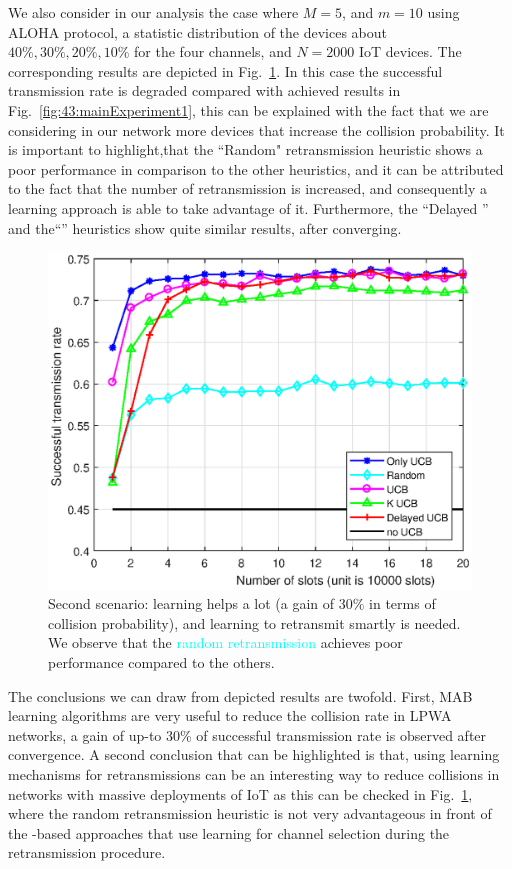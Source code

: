 We also consider in our analysis the case where $M=5$, and $m=10$ using ALOHA protocol, a statistic distribution of the devices about $40\%, 30\%, 20\%, 10\%$ for the four channels, and $N=2000$ IoT devices.
The corresponding results are depicted in Fig.~\ref{fig:43:mainExperiment2}.
In this case the successful transmission rate is degraded compared with achieved results in Fig.~\ref{fig:43:mainExperiment1}, this can be explained with the fact that we are considering in our network more devices that increase the collision probability.
It is important to highlight,that the ``Random" retransmission heuristic shows a poor performance in comparison to the other heuristics, and it can be attributed to the fact that the number of retransmission is increased, and consequently a
learning approach is able to take advantage of it.
Furthermore, the ``Delayed \UCB'' and  the``\UCB'' heuristics show quite similar results, after converging.
%

\begin{figure}[h!]  %
	\centering
	\includegraphics[width=0.75\linewidth]{ResultsUCB2.eps}
	\caption{
		Second scenario: learning helps a lot (a gain of $30\%$ in terms of collision probability), and learning to retransmit smartly is needed.
		We observe that the \textcolor{cyan}{random retransmission} achieves poor performance compared to the others.
	}
	\label{fig:43:mainExperiment2}
\end{figure}

The conclusions we can draw from depicted results are twofold.
First, MAB learning algorithms are very useful to reduce the collision rate in LPWA networks, a gain of up-to $30\%$ of successful transmission rate is observed after convergence.
A second conclusion that can be highlighted is that, using learning mechanisms for retransmissions can be an interesting way to reduce collisions in networks with massive deployments of IoT as this can be checked in Fig.~\ref{fig:43:mainExperiment2}, where the random retransmission heuristic is not very advantageous in front of the  \UCB-based approaches that use learning for channel selection during the retransmission procedure.


